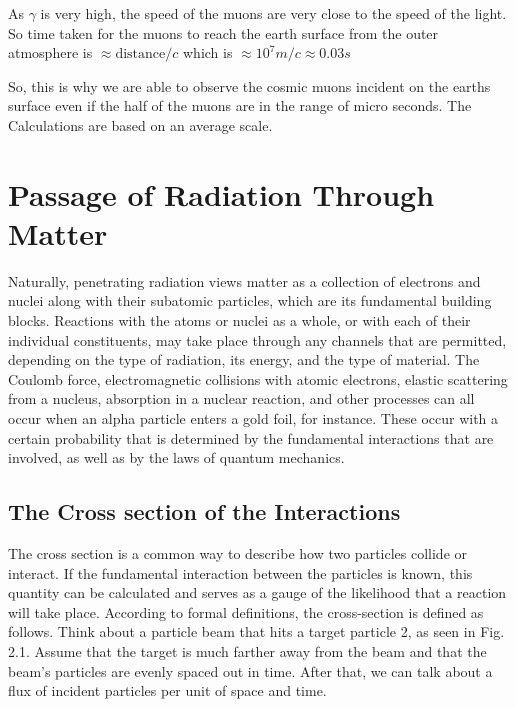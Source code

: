 \documentclass{article}
\begin{document}
\begin{multicols}{2}
As $\gamma$ is very high, the speed of the muons are very close to the speed of the
light. So time taken for the muons to reach the earth surface from the outer atmosphere is $\approx \text{distance}/c$
which is $\approx 10^{7}m/c \approx 0.03s$

So, this is why we are able to observe the cosmic muons incident on the earths surface
even if the half of the muons are in the range of micro seconds. The Calculations are based on an average scale.






\section{Passage of Radiation Through Matter}

Naturally, penetrating radiation views matter as a collection 
of electrons and nuclei along with their subatomic particles, 
which are its fundamental building blocks. Reactions with the 
atoms or nuclei as a whole, or with each of their individual 
constituents, may take place through any channels that are permitted,
depending on the type of radiation, its energy, and the type of 
material. The Coulomb force, electromagnetic collisions with atomic 
electrons, elastic scattering from a nucleus, absorption in a 
nuclear reaction, and other processes can all occur when an alpha 
particle enters a gold foil, for instance. These occur with a 
certain probability that is determined by the fundamental 
interactions that are involved, as well as by the laws of quantum 
mechanics. 



\subsection{The Cross section of the Interactions}

The cross section is a common way to describe how two particles 
collide or interact. If the fundamental interaction between the 
particles is known, this quantity can be calculated and serves as a 
gauge of the likelihood that a reaction will take place. According 
to formal definitions, the cross-section is defined as follows. 
Think about a particle beam that hits a target particle 2, as 
seen in Fig. 2.1. Assume that the target is much farther away 
from the beam and that the beam's particles are evenly spaced out 
in time. After that, we can talk about a flux of incident particles 
per unit of space and time. 


\end{multicols}
\end{document}
